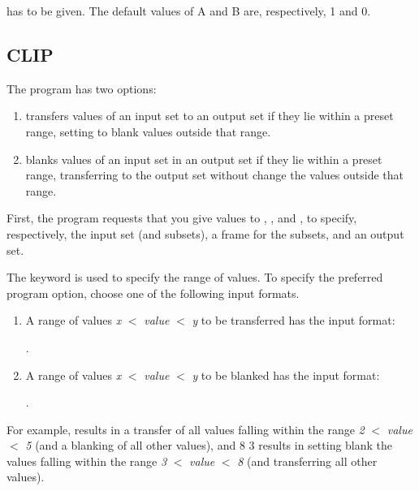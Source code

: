 
has to be given. The default values of A and B are, respectively, 1 and 0.

\subsection*{CLIP}

The program  has two options:

\begin{enumerate}

\item {} transfers values of an input set to an output set
if they lie within a preset range, setting to blank values outside that
range. 

\item {} blanks values of an input set in an output set if
they lie within a preset range, transferring to the output set without
change the values outside that range. 

\end{enumerate}

First, the program requests that you give values to ,
, and , to specify, respectively, the
input set (and subsets), a frame for the subsets, and an output set. 

The keyword  is used to specify the range of values.  To
specify the preferred program option, choose one of the following input
formats. 

\begin{enumerate}

\item A range of values {\em x} $<$ {\em value} $<$ {\em y} to be
transferred has the input format:

.

\item A range of values {\em x} $<$ {\em value} $<$ {\em y} to be
blanked has the input format:

.

\end{enumerate}

For example,  results in a transfer of all values
falling within the range {\em 2} $<$ {\em value} $<$ {\em 5} (and a
blanking of all other values), and  {\small 8 3} results
in setting blank the values falling within the range {\em 3} $<$ {\em
value} $<$ {\em 8} (and transferring all other values). 

